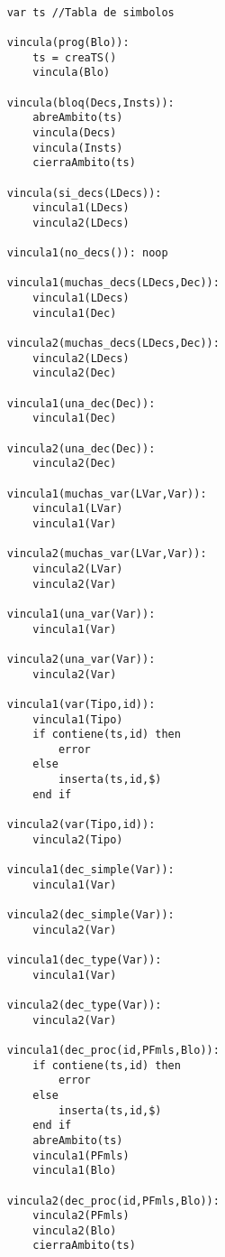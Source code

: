 
\begin{lstlisting}

    var ts //Tabla de simbolos

    vincula(prog(Blo)):
        ts = creaTS()
        vincula(Blo)

    vincula(bloq(Decs,Insts)):
        abreAmbito(ts)
        vincula(Decs)
        vincula(Insts)
        cierraAmbito(ts)
    
    vincula(si_decs(LDecs)):
        vincula1(LDecs)
        vincula2(LDecs)
    
    vincula1(no_decs()): noop
    
    vincula1(muchas_decs(LDecs,Dec)):
        vincula1(LDecs)
        vincula1(Dec)
    
    vincula2(muchas_decs(LDecs,Dec)):
        vincula2(LDecs)
        vincula2(Dec)
    
    vincula1(una_dec(Dec)):
        vincula1(Dec)

    vincula2(una_dec(Dec)):
        vincula2(Dec)

    vincula1(muchas_var(LVar,Var)):
        vincula1(LVar)
        vincula1(Var)

    vincula2(muchas_var(LVar,Var)):
        vincula2(LVar)
        vincula2(Var)

    vincula1(una_var(Var)):
        vincula1(Var)
    
    vincula2(una_var(Var)):
        vincula2(Var)

    vincula1(var(Tipo,id)):
        vincula1(Tipo)
        if contiene(ts,id) then
            error
        else
            inserta(ts,id,$)
        end if

    vincula2(var(Tipo,id)):
        vincula2(Tipo)
    
    vincula1(dec_simple(Var)):
        vincula1(Var)

    vincula2(dec_simple(Var)):
        vincula2(Var)

    vincula1(dec_type(Var)):
        vincula1(Var)
    
    vincula2(dec_type(Var)):
        vincula2(Var)
    
    vincula1(dec_proc(id,PFmls,Blo)):
        if contiene(ts,id) then
            error
        else
            inserta(ts,id,$)
        end if
        abreAmbito(ts)
        vincula1(PFmls)
        vincula1(Blo)

    vincula2(dec_proc(id,PFmls,Blo)):
        vincula2(PFmls)
        vincula2(Blo)
        cierraAmbito(ts)


\end{lstlisting}
